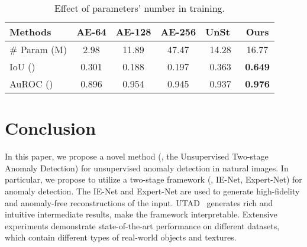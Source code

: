 \documentclass[final]{cvpr}
\newcommand{\proposed}{UTAD}
\begin{document}
\begin{table}[htbp]
\renewcommand\arraystretch{1.0}
    \setlength{\tabcolsep}{1.5mm}
    \centering
    \small
    \caption{Effect of parameters' number in training.}
	\label{tab:param_analysis}
\begin{tabular}{lccccc}
		\toprule[1.2pt]
         Methods      &  AE-64 & AE-128 & AE-256 & UnSt~\cite{A:bergmann2020uninformed} & Ours  \\
         \hline
         \# Param (M)        &  2.98  & 11.89 &  47.47  & 14.28 & 16.77 \\
		 \rowcolor{mygray}
         IoU ()    &  0.301 & 0.188 & 0.197   & 0.363 & \textbf{0.649} \\
         AuROC ()  &  0.896 & 0.954 & 0.945   & 0.937 & \textbf{0.976} \\
		\bottomrule[1.2pt]
    \end{tabular}  
\vspace{-0.3cm}
\end{table}

\section{Conclusion}

In this paper, we propose a novel method (\ie, the Unsupervised Two-stage Anomaly Detection) for unsupervised anomaly detection in natural images. In particular, we propose to utilize a two-stage framework (\ie, IE-Net, Expert-Net) for anomaly detection. The IE-Net and Expert-Net are used to generate high-fidelity and anomaly-free reconstructions of the input. \proposed~ generates rich and intuitive intermediate results, make the framework interpretable. Extensive experiments demonstrate state-of-the-art performance on different datasets, which contain different types of real-world objects and textures.


{\small


}

\appendix
\end{document}
